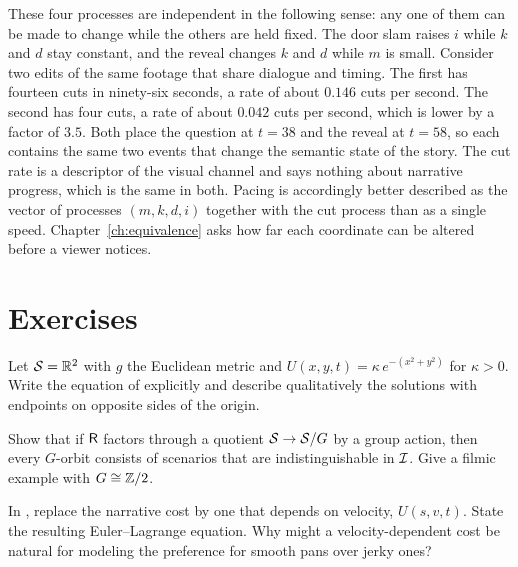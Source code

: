These four processes are independent in the following sense: any one of them can be made to change while the others are held fixed. The door slam raises $i$ while $k$ and $d$ stay constant, and the reveal changes $k$ and $d$ while $m$ is small. Consider two edits of the same footage that share dialogue and timing. The first has fourteen cuts in ninety-six seconds, a rate of about $0.146$ cuts per second. The second has four cuts, a rate of about $0.042$ cuts per second, which is lower by a factor of $3.5$. Both place the question at $t=38$ and the reveal at $t=58$, so each contains the same two events that change the semantic state of the story. The cut rate is a descriptor of the visual channel and says nothing about narrative progress, which is the same in both. Pacing is accordingly better described as the vector of processes $(m,k,d,i)$ together with the cut process than as a single speed. Chapter~\ref{ch:equivalence} asks how far each coordinate can be altered before a viewer notices.

\section*{Exercises}

\begin{exercise}
Let $\mathcal{S}=\mathbb{R}^2$ with $g$ the Euclidean metric and $U(x,y,t)=\kappa\,e^{-(x^2+y^2)}$ for $\kappa>0$. Write the equation of  explicitly and describe qualitatively the solutions with endpoints on opposite sides of the origin.
\end{exercise}

\begin{exercise}
Show that if $\mathsf{R}$ factors through a quotient $\mathcal{S}\to\mathcal{S}/G$ by a group action, then every $G$-orbit consists of scenarios that are indistinguishable in $\mathcal{I}$. Give a filmic example with $G\cong\mathbb{Z}/2$.
\end{exercise}

\begin{exercise}
In , replace the narrative cost by one that depends on velocity, $U(s,v,t)$. State the resulting Euler--Lagrange equation. Why might a velocity-dependent cost be natural for modeling the preference for smooth pans over jerky ones?
\end{exercise}

